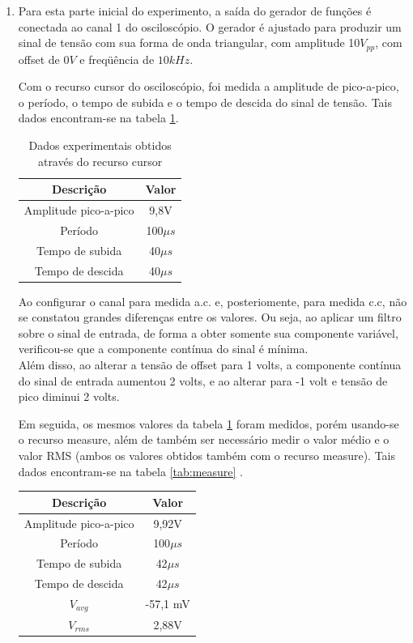 \documentclass[a4paper]{article} %
\begin{document}
\begin{enumerate}
\item Para esta parte inicial do experimento, a saída do gerador de funções é conectada ao canal 1 do osciloscópio. O gerador é ajustado para produzir um sinal de tensão com sua forma de onda triangular, com amplitude 10$V_{pp}$, com offset de $0V$ e freqüência de $10kHz$. 
 
Com o recurso cursor do osciloscópio, foi medida a amplitude de pico-a-pico, o período, o tempo de subida e o tempo de descida do sinal de tensão. Tais dados encontram-se na tabela \ref{tab:cursors}. 


\begin{table}[h]
\begin{centering}
\begin{tabular}{cc}
\hline 
Descrição & Valor\tabularnewline
\hline
Amplitude pico-a-pico & 9,8V\tabularnewline
Período & 100$\mu s$\tabularnewline
Tempo de subida & 40$\mu s$\tabularnewline
Tempo de descida  & 40$\mu s$\tabularnewline
\hline
\end{tabular}
\par\end{centering}

\caption{Dados experimentais obtidos através do recurso cursor \label{tab:cursors}}
\end{table}

Ao configurar o canal para medida a.c. e, posteriomente, para medida c.c, não se constatou grandes diferenças entre os valores. Ou seja, ao aplicar um 
filtro sobre o sinal de entrada, de forma a obter somente sua componente variável, verificou-se que a componente contínua do sinal é mínima. \\
Além disso, ao alterar a tensão de offset para 1 volts, a componente contínua do sinal de entrada aumentou 2 volts, e ao alterar para -1 volt e tensão de pico diminui 2 volts. 

Em seguida, os mesmos valores da tabela \ref{tab:cursors} foram medidos, porém usando-se o recurso measure, além de também ser necessário medir o valor médio e o valor RMS (ambos os valores obtidos também com o recurso measure). Tais dados encontram-se na tabela \ref{tab:measure} . 


\begin{table}[h]
\begin{centering}
\begin{tabular}{cc}
\hline 
Descrição & Valor\tabularnewline
\hline
Amplitude pico-a-pico & 9,92V \tabularnewline
Período & 100$\mu s$\tabularnewline
Tempo de subida & 42$\mu s$\tabularnewline
Tempo de descida  & 42$\mu s$\tabularnewline
$V_{avg}$ & -57,1 mV\tabularnewline
$V_{rms}$ & 2,88V \tabularnewline
\hline
\end{tabular}
\par\end{centering}


\end{table}
\end{enumerate}
\end{document}
